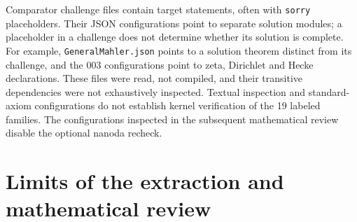 \documentclass[11pt]{article}
\begin{document}
Comparator challenge files contain target statements, often with \texttt{sorry} placeholders. Their JSON configurations point to separate solution modules; a placeholder in a challenge does not determine whether its solution is complete. For example, \texttt{GeneralMahler.json} points to a solution theorem distinct from its challenge, and the 003 configurations point to zeta, Dirichlet and Hecke declarations. These files were read, not compiled, and their transitive dependencies were not exhaustively inspected. Textual inspection and standard-axiom configurations do not establish kernel verification of the 19 labeled families. The configurations inspected in the subsequent mathematical review disable the optional nanoda recheck.

\section{\texorpdfstring{Limits of the extraction and mathematical review}{Limits of the extraction and mathematical review}}\label{sec:limits}
\end{document}
